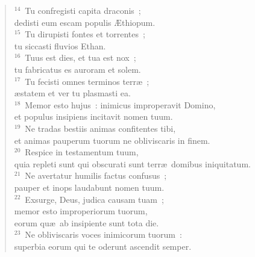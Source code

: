 \begin{flushleft}
\begin{verse}
${}^{14}$~Tu confregisti capita draconis~;\\ dedisti eum escam populis \AE thiopum.\\
${}^{15}$~Tu dirupisti fontes et torrentes~;\\ tu siccasti fluvios Ethan.\\
${}^{16}$~Tuus est dies, et tua est nox~;\\ tu fabricatus es auroram et solem.\\
${}^{17}$~Tu fecisti omnes terminos terr\ae~;\\ \ae statem et ver tu plasmasti ea.\\
${}^{18}$~Memor esto hujus~: inimicus improperavit Domino,\\ et populus insipiens incitavit nomen tuum.\\
${}^{19}$~Ne tradas bestiis animas confitentes tibi,\\ et animas pauperum tuorum ne obliviscaris in finem.\\
${}^{20}$~Respice in testamentum tuum,\\ quia repleti sunt qui obscurati sunt terr\ae\ domibus iniquitatum.\\
${}^{21}$~Ne avertatur humilis factus confusus~;\\ pauper et inops laudabunt nomen tuum.\\
${}^{22}$~Exsurge, Deus, judica causam tuam~;\\ memor esto improperiorum tuorum,\\ eorum qu\ae\ ab insipiente sunt tota die.\\
${}^{23}$~Ne obliviscaris voces inimicorum tuorum~:\\ superbia eorum qui te oderunt ascendit semper.\end{verse}\end{flushleft}



